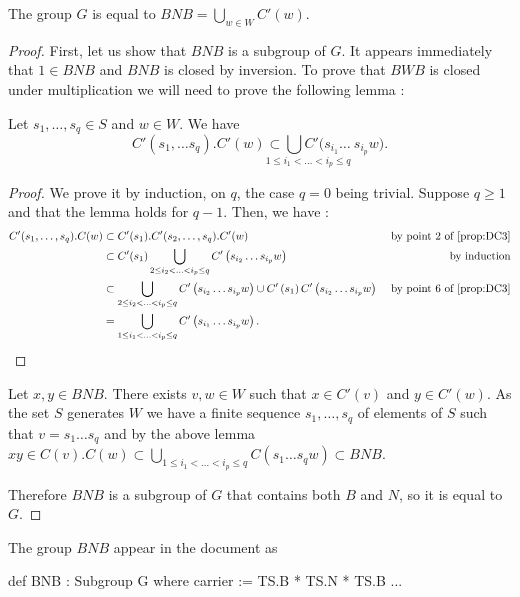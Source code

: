 \begin{theoreme} \label{thm:DCD}
    The group $G$ is equal to $B N B = \bigcup_{w \in W} C'\left( w \right)$.
\end{theoreme}

\begin{proof}
    First, let us show that $BNB$ is a subgroup of $G$. It appears immediately that $1 \in BNB$ and $BNB $ is closed by inversion. To prove that $BWB$ is closed under multiplication we will need to prove the following lemma : 
\begin{lemme} \label{lem:BWB}
    Let $s_1, \ldots,s_q \in S$ and $w \in W$. We have
    \[
        C'\left( s_1,\ldots s_q \right). C'(w) \underset{1\le i_1 < ... < i_p \le q}{\subset \bigcup C' ( s_{i_1}\ldots }\ s_{i_p} w )
    .\] 
\end{lemme} 
\begin{proof}
    We prove it by induction, on $q$, the case $q=0$ being trivial. Suppose $q \ge 1 $ and that the lemma holds for $q -1$. Then, we have :
    \begin{align*}
        C'(s_1,\ldots,s_q). C(w) &\subset C'(s_1).C'(s_2,\ldots,s_q).C'(w) &\text{ by point 2 of \ref{prop:DC3}}\\
                                 &\subset C'(s_1) \bigcup_{2\le i_2 < ... < i_p \le q} C'\left( s_{i_2}\ldots s_{i_p} w \right)& \text{ by induction}\\
                                 & \subset \bigcup_{2\le i_2 < ... < i_p \le q} C'\left( s_{i_2}\ldots s_{i_p} w \right) \cup C'\left( s_1 \right)C'\left( s_{i_2}\ldots s_{i_p} w \right) & \text{ by point 6 of \ref{prop:DC3}}\\
                                 &= \bigcup_{1\le i_1 < ... < i_p \le q} C'\left( s_{i_1}\ldots s_{i_p} w \right)
    .\end{align*}
\end{proof}


Let $x,y \in BNB$. There exists $v,w \in W$ such that $x \in C'(v)$ and $y \in C'(w)$. As the set $S$ generates $W$ we have a finite sequence $s_1,\ldots,s_q$ of elements of $S$ such that $v = s_1 \ldots s_q$ and by the above lemma $xy \in C(v).C(w) \subset \bigcup_{1 \le i_1 < ... < i_p \le q} C(s_1\ldots s_q w) \subset BNB$.

Therefore $BNB$ is a subgroup of $G$ that contains both $B$ and $N$, so it is equal to $G$.
\end{proof}

The group $BNB$ appear in the document  as 
\begin{leancode}
def BNB : Subgroup G where
  carrier := TS.B *  TS.N * TS.B
  ...
\end{leancode}

